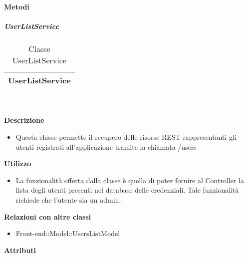		\textbf{Metodi} 
	\begin{itemize}
		\end{itemize}
			\subparagraph{UserListService} 
\begin{table}[ht]
\begin{center}
\bgroup
	\setlength{\arrayrulewidth}{0.6mm}
	\def\arraystretch{1}
		\begin{tabular}{ | p{12cm} | }
				\hline  
					\centerline{\textbf{UserListService}}
		\\ \hline 
				\hline
				\hline
		
		\end{tabular}
\egroup
\caption{Classe UserListService}
\end{center}
\end{table}  \textbf{\\ \\ Descrizione} 
					\begin{itemize}
						\item[] Questa classe permette il recupero delle risorse REST rappresentanti gli utenti registrati all'applicazione tramite la chiamata /users
					\end{itemize}      
				\textbf{Utilizzo}  
					\begin{itemize}
						\item[] La funzionalità offerta dalla classe è quella di poter fornire al Controller la lista degli utenti presenti nel database delle credenziali.
Tale funzionalità richiede che l'utente sia un admin.
					\end{itemize}
					\textbf{Relazioni con altre classi}
					\begin{itemize}
							\item{Front-end::Model::UsersListModel}
					\end{itemize}
			 \textbf{Attributi} 
	\begin{itemize}
		\end{itemize}
		
